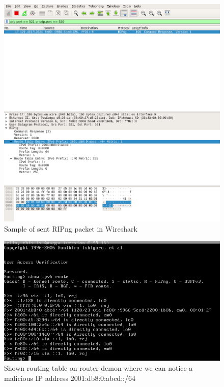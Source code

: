 \documentclass[11pt,a4paper]{article}
\begin{document}
\begin{figure}[H]
	
	\includegraphics[width=12cm]{img/send_packet.png} 
	\caption{Sample of sent RIPng packet in Wireshark}
	\label{fig:send_packet}

\end{figure}

\begin{figure}[H]
	
	\includegraphics[width=17cm]{img/bsdroute.png} 
	\caption{Shown routing table on router demon where we can notice a malicious IP address 2001:db8:0:abcd::/64 }
	\label{fig:bsdroute}

\end{figure}
\end{document}
